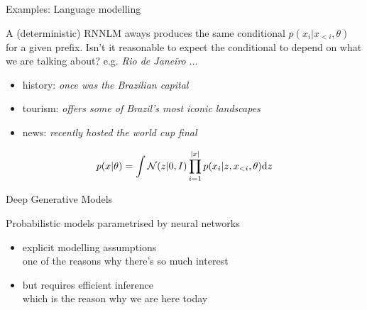 \begin{frame}{Examples: Language modelling}

	A (deterministic) RNNLM aways produces the same conditional $p(x_i|x_{<i}, \theta)$ for a given prefix. \pause Isn't it reasonable to expect the conditional to depend on what we are talking about? \pause e.g. \emph{\alert{Rio de Janeiro $\ldots$}}
	\begin{itemize}
		\item history: \emph{\alert{once was the Brazilian capital}}
		\item tourism: \emph{\alert{offers some of Brazil's most iconic landscapes}}
		\item news: \emph{\alert{recently hosted the world cup final}}
	\end{itemize} \pause
	\vspace{-5pt}
	\begin{equation*}
		p(x|\theta) = \int \mathcal N(z|0, I) \prod_{i=1}^{\abs{x}} p(x_i|z, x_{<i}, \theta) \dd z
	\end{equation*}

\end{frame}


\begin{frame}{Deep Generative Models}

Probabilistic models parametrised by neural networks
\begin{itemize}
	\pause
	\item explicit modelling assumptions\\
	one of the reasons why there's so much interest	
	\pause
	\item but requires efficient inference\\
	\pause
	\alert{which is the reason why we are here today}
\end{itemize}

\end{frame}